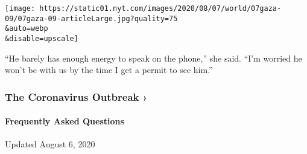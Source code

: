 \texttt{[image: https://static01.nyt.com/images/2020/08/07/world/07gaza-09/07gaza-09-articleLarge.jpg?quality=75\\\&auto=webp\\\&disable=upscale]}

``He barely has enough energy to speak on the phone,'' she said. ``I'm
worried he won't be with us by the time I get a permit to see him.''

\href{https://www.nytimes.com/news-event/coronavirus?action=click\&pgtype=Article\&state=default\&region=MAIN_CONTENT_3\&context=storylines_faq}{}

\hypertarget{the-coronavirus-outbreak-}{%
\subsubsection{The Coronavirus Outbreak
›}\label{the-coronavirus-outbreak-}}

\hypertarget{frequently-asked-questions}{%
\paragraph{Frequently Asked
Questions}\label{frequently-asked-questions}}

Updated August 6, 2020

